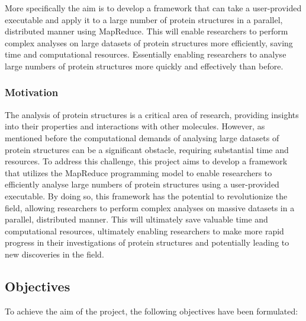 \documentclass[]{final_report}
\begin{document}
More specifically the aim is to develop a framework that can take a user-provided executable and apply it to a large number of protein structures in a parallel, distributed manner using MapReduce. This will enable researchers to perform complex analyses on large datasets of protein structures more efficiently, saving time and computational resources. Essentially enabling researchers to analyse large numbers of protein structures more quickly and effectively than before.

\subsubsection{Motivation}
The analysis of protein structures is a critical area of research, providing insights into their properties and interactions with other molecules. However, as mentioned before the computational demands of analysing large datasets of protein structures can be a significant obstacle, requiring substantial time and resources. To address this challenge, this project aims to develop a framework that utilizes the MapReduce programming model to enable researchers to efficiently analyse large numbers of protein structures using a user-provided executable. By doing so, this framework has the potential to revolutionize the field, allowing researchers to perform complex analyses on massive datasets in a parallel, distributed manner. This will ultimately save valuable time and computational resources, ultimately enabling researchers to make more rapid progress in their investigations of protein structures and potentially leading to new discoveries in the field.
\clearpage

\subsection{Objectives}

To achieve the aim of the project, the following objectives have been formulated:
\end{document}
